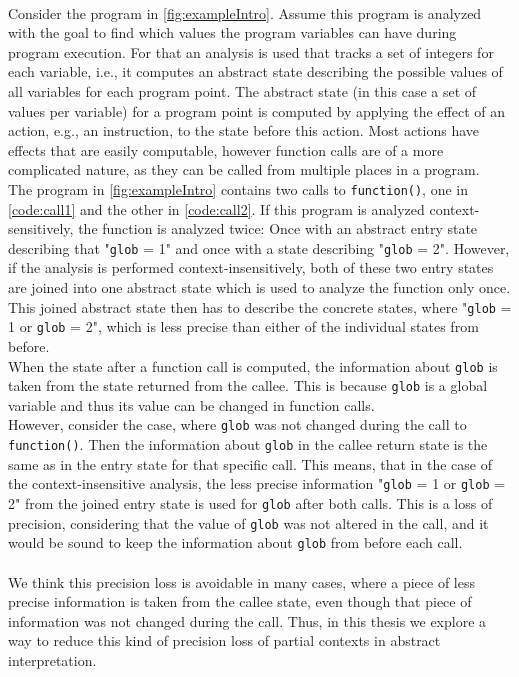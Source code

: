   \\
  Consider the program in \autoref{fig:exampleIntro}. Assume this program is analyzed with the goal to find which values the program variables can have during program execution. For that an analysis is used that tracks a set of integers for each variable, i.e., it computes an abstract state describing the possible values of all variables for each program point. The abstract state (in this case a set of values per variable) for a program point is computed by applying the effect of an action, e.g., an instruction, to the state before this action. Most actions have effects that are easily computable, however function calls are of a more complicated nature, as they can be called from multiple places in a program.\\
  The program in \autoref{fig:exampleIntro} contains two calls to \texttt{function()}, one in \autoref{code:call1} and the other in \autoref{code:call2}. If this program is analyzed context-sensitively, the function is analyzed twice: Once with an abstract entry state describing that "\texttt{glob} = 1" and once with a state describing "\texttt{glob} = 2". However, if the analysis is performed context-insensitively, both of these two entry states are joined into one abstract state which is used to analyze the function only once. This joined abstract state then has to describe the concrete states, where "\texttt{glob} = 1 or \texttt{glob} = 2", which is less precise than either of the individual states from before.\\
  When the state after a function call is computed, the information about \texttt{glob} is taken from the state returned from the callee. This is because \texttt{glob} is a global variable and thus its value can be changed in function calls.\\
  However, consider the case, where \texttt{glob} was not changed during the call to \texttt{function()}. Then the information about \texttt{glob} in the callee return state is the same as in the entry state for that specific call. This means, that in the case of the context-insensitive analysis, the less precise information "\texttt{glob} = 1 or \texttt{glob} = 2" from the joined entry state is used for \texttt{glob} after both calls. This is a loss of precision, considering that the value of \texttt{glob} was not altered in the call, and it would be sound to keep the information about \texttt{glob} from before each call.\\
  \\
  We think this precision loss is avoidable in many cases, where a piece of less precise information is taken from the callee state, even though that piece of information was not changed during the call. Thus, in this thesis we explore a way to reduce this kind of precision loss of partial contexts in abstract interpretation. 

